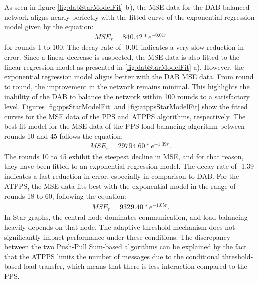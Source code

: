 As seen in figure \ref{fig:dabStarModelFit} b), the MSE data for the DAB-balanced network aligns nearly perfectly with the fitted curve of the exponential regression model given by the equation:
\begin{align}
    MSE_r=840.42*e^{-0.01r}    
\end{align}
for rounds 1 to 100. The decay rate of -0.01 indicates a very slow reduction in error. Since a linear decrease is suspected, the MSE data is also fitted to the linear regression model as presented in \ref{fig:dabStarModelFit} a). However, the exponential regression model aligns better with the DAB MSE data. From round to round, the improvement in the network remains minimal. This highlights the inability of the DAB to balance the network within 100 rounds to a satisfactory level. Figures \ref{fig:ppsStarModelFit} and \ref{fig:atppsStarModelFit} show the fitted curves for the MSE data of the PPS and ATPPS algorithms, respectively. The best-fit model for the MSE data of the PPS load balancing algorithm between rounds 10 and 45 follows the equation:
\begin{align}
    MSE_r=29794.60*e^{-1.39r}.    
\end{align}
The rounds 10 to 45 exhibit the steepest decline in MSE, and for that reason, they have been fitted to an exponential regression model. The decay rate of -1.39 indicates a fast reduction in error, especially in comparison to DAB. For the ATPPS, the MSE data fits best with the exponential model in the range of rounds 18 to 60, following the equation:
\begin{align}
    MSE_r=9329.40*e^{-1.05r}.    
\end{align}
In Star graphs, the central node dominates communication, and load balancing heavily depends on that node. The adaptive threshold mechanism does not significantly impact performance under these conditions. The discrepancy between the two Push-Pull Sum-based algorithms can be explained by the fact that the ATPPS limits the number of messages due to the conditional threshold-based load transfer, which means that there is less interaction compared to the PPS.

